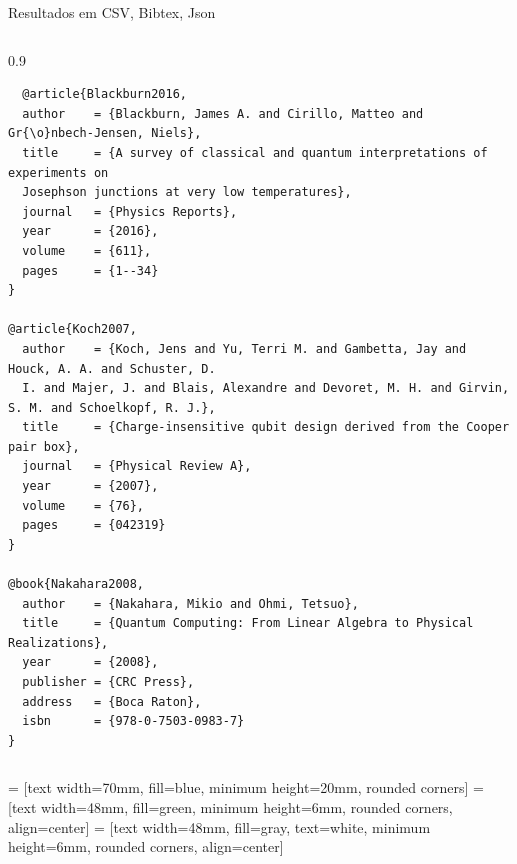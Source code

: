 \documentclass[aspectratio=169,usenames,dvipsnames,compress]{beamer}
\begin{document}
\begin{frame}[fragile]{Resultados em CSV, Bibtex, Json}

\begin{columns}
\begin{column}{0.9\textwidth}

{\tiny
\begin{verbatim}
  @article{Blackburn2016,
  author    = {Blackburn, James A. and Cirillo, Matteo and Gr{\o}nbech-Jensen, Niels},
  title     = {A survey of classical and quantum interpretations of experiments on 
  Josephson junctions at very low temperatures},
  journal   = {Physics Reports},
  year      = {2016},
  volume    = {611},
  pages     = {1--34}
}

@article{Koch2007,
  author    = {Koch, Jens and Yu, Terri M. and Gambetta, Jay and Houck, A. A. and Schuster, D.
  I. and Majer, J. and Blais, Alexandre and Devoret, M. H. and Girvin, S. M. and Schoelkopf, R. J.},
  title     = {Charge-insensitive qubit design derived from the Cooper pair box},
  journal   = {Physical Review A},
  year      = {2007},
  volume    = {76},
  pages     = {042319}
}

@book{Nakahara2008,
  author    = {Nakahara, Mikio and Ohmi, Tetsuo},
  title     = {Quantum Computing: From Linear Algebra to Physical Realizations},
  year      = {2008},
  publisher = {CRC Press},
  address   = {Boca Raton},
  isbn      = {978-0-7503-0983-7}
}
\end{verbatim}
}
\end{column}
\end{columns}
\end{frame}


\begin{frame}{}

 = [text width=70mm, fill=blue,  minimum height=20mm, rounded corners]
 = [text width=48mm, fill=green, minimum height=6mm, rounded corners, align=center] 
 = [text width=48mm, fill=gray, text=white, minimum height=6mm, rounded corners, align=center] 
\end{frame}
\end{document}
